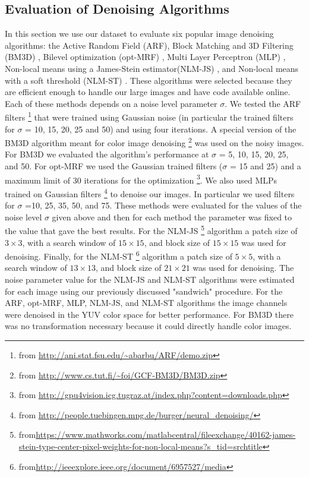 \documentclass[review]{elsarticle}
\begin{document}
\subsection{Evaluation of Denoising Algorithms}

In this section we use our dataset to evaluate six popular image denoising algorithms: the Active Random Field (ARF)\cite{barbu2009training}, Block Matching and 3D Filtering (BM3D) \cite{dabov2007image}, Bilevel optimization (opt-MRF) \cite{optMRF}, Multi Layer Perceptron (MLP) \cite{NeuralNetworkCompete}, Non-local means using a James-Stein estimator(NLM-JS) \cite{JS-NLM}, and Non-local means with a soft threshold (NLM-ST) \cite{lu2015non}. These algorithms were selected because they are efficient enough to handle our large images and have code available online. Each of these methods depends on a noise level parameter $\sigma$. We tested the ARF filters \footnote{from \url{http://ani.stat.fsu.edu/~abarbu/ARF/demo.zip}} that were trained using Gaussian noise (in particular the trained filters for $\sigma$ = 10, 15, 20, 25 and 50) and using four iterations. A special version of the BM3D algorithm meant for color image denoising \footnote{from \url{http://www.cs.tut.fi/~foi/GCF-BM3D/BM3D.zip}} was used on the noisy images. For BM3D we evaluated the algorithm's performance at $\sigma$ = 5, 10, 15, 20, 25, and 50. For opt-MRF we used the Gaussian trained filters ($\sigma$ = 15 and 25)  and a maximum limit of 30 iterations for the optimization \footnote{from \url{http://gpu4vision.icg.tugraz.at/index.php?content=downloads.php}}. We also used MLPs trained on Gaussian filters 
\footnote{from \url{http://people.tuebingen.mpg.de/burger/neural_denoising/}} to denoise our images. In particular we used filters for $\sigma$ =10, 25, 35, 50, and 75. These methods were evaluated for the values of the noise level $\sigma$ given above and then  for each method the parameter was fixed to the value that gave the best results. 
For the NLM-JS \footnote{from\url{https://www.mathworks.com/matlabcentral/fileexchange/40162-james-stein-type-center-pixel-weights-for-non-local-means?s_tid=srchtitle}} algorithm a patch size of $3 \times 3$, with a search window of $15 \times 15$, and block size of $15 \times 15$ was used for denoising. Finally, for the NLM-ST \footnote{from\url{http://ieeexplore.ieee.org/document/6957527/media}} algorithm a patch size of $5 \times 5$, with a search window of $13 \times 13$, and block size of $21 \times 21$ was used for denoising. 
The noise parameter value for the NLM-JS and NLM-ST algorithms were estimated for each image using our previously discussed "sandwich" procedure. For the ARF, opt-MRF, MLP, NLM-JS, and NLM-ST algorithms the image channels were denoised in the YUV color space for better performance. For BM3D there was no transformation necessary because it could directly handle color images.
\end{document}
